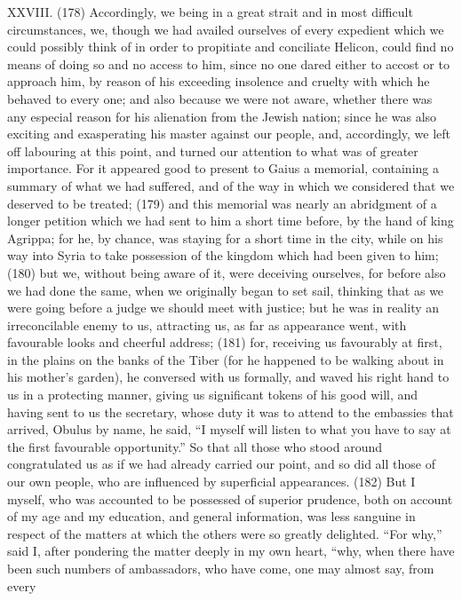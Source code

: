 XXVIII. (178) Accordingly, we being in a great strait and in most difficult circumstances, we, though
we had availed ourselves of every expedient which we could possibly think of in order to propitiate
and conciliate Helicon, could find no means of doing so and no access to him, since no one dared
either to accost or to approach him, by reason of his exceeding insolence and cruelty with which
he behaved to every one; and also because we were not aware, whether there was any especial
reason for his alienation from the Jewish nation; since he was also exciting and exasperating his
master against our people, and, accordingly, we left off labouring at this point, and turned our
attention to what was of greater importance. For it appeared good to present to Gaius a memorial,
containing a summary of what we had suffered, and of the way in which we considered that we
deserved to be treated; (179) and this memorial was nearly an abridgment of a longer petition
which we had sent to him a short time before, by the hand of king Agrippa; for he, by chance, was
staying for a short time in the city, while on his way into Syria to take possession of the kingdom
which had been given to him; (180) but we, without being aware of it, were deceiving ourselves, for
before also we had done the same, when we originally began to set sail, thinking that as we were
going before a judge we should meet with justice; but he was in reality an irreconcilable enemy to
us, attracting us, as far as appearance went, with favourable looks and cheerful address; (181)
for, receiving us favourably at first, in the plains on the banks of the Tiber (for he happened to be
walking about in his mother's garden), he conversed with us formally, and waved his right hand to
us in a protecting manner, giving us significant tokens of his good will, and having sent to us the
secretary, whose duty it was to attend to the embassies that arrived, Obulus by name, he said, ``I
myself will listen to what you have to say at the first favourable opportunity.'' So that all those who
stood around congratulated us as if we had already carried our point, and so did all those of our
own people, who are influenced by superficial appearances. (182) But I myself, who was
accounted to be possessed of superior prudence, both on account of my age and my education,
and general information, was less sanguine in respect of the matters at which the others were so
greatly delighted. ``For why,'' said I, after pondering the matter deeply in my own heart, ``why, when
there have been such numbers of ambassadors, who have come, one may almost say, from every
